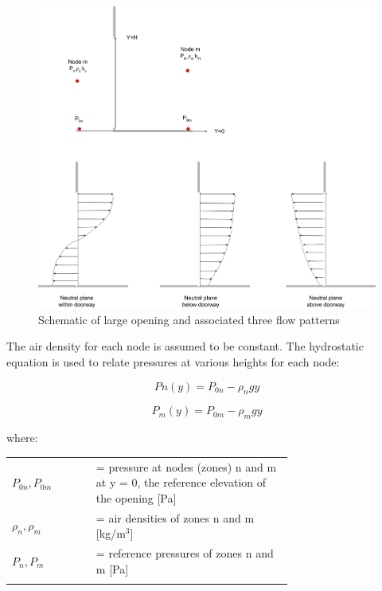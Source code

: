 \begin{figure}[hbtp] %
\centering
\includegraphics[width=0.9\linewidth, height=0.9\textheight, keepaspectratio=true]{media/image2708.svg.png}
\caption{Schematic of large opening and associated three flow patterns \protect \label{fig:schematic-of-large-opening-and-associated}}
\end{figure}

The air density for each node is assumed to be constant. The hydrostatic equation is used to relate pressures at various heights for each node:

\begin{equation}
Pn\left( y \right) = {P_{0n}} - {\rho_n}gy
\end{equation}

\begin{equation}
{P_m}(y) = {P_{0m}} - {\rho_m}gy
\end{equation}

where:

\begin{tabular}{lp{0.7\linewidth}}
\\
$P_{0n}, P_{0m}$ &= pressure at nodes (zones) n and m at y = 0, the reference elevation of the opening [Pa] \\
$\rho_n, \rho_m$ &= air densities of zones n and m [kg/m\(^{3}\)] \\
$P_n, P_m$ &= reference pressures of zones n and m [Pa] \\
\\
\end{tabular}

